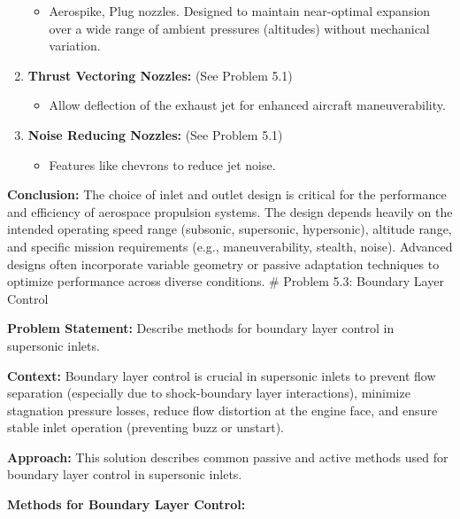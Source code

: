 \begin{enumerate}
  \begin{itemize}
  \tightlist
  \item
    Aerospike, Plug nozzles. Designed to maintain near-optimal expansion
    over a wide range of ambient pressures (altitudes) without
    mechanical variation.
  \end{itemize}
\item
  \textbf{Thrust Vectoring Nozzles:} (See Problem 5.1)

  \begin{itemize}
  \tightlist
  \item
    Allow deflection of the exhaust jet for enhanced aircraft
    maneuverability.
  \end{itemize}
\item
  \textbf{Noise Reducing Nozzles:} (See Problem 5.1)

  \begin{itemize}
  \tightlist
  \item
    Features like chevrons to reduce jet noise.
  \end{itemize}
\end{enumerate}

\textbf{Conclusion:} The choice of inlet and outlet design is critical
for the performance and efficiency of aerospace propulsion systems. The
design depends heavily on the intended operating speed range (subsonic,
supersonic, hypersonic), altitude range, and specific mission
requirements (e.g., maneuverability, stealth, noise). Advanced designs
often incorporate variable geometry or passive adaptation techniques to
optimize performance across diverse conditions. \# Problem 5.3: Boundary
Layer Control

\textbf{Problem Statement:} Describe methods for boundary layer control
in supersonic inlets.

\textbf{Context:} Boundary layer control is crucial in supersonic inlets
to prevent flow separation (especially due to shock-boundary layer
interactions), minimize stagnation pressure losses, reduce flow
distortion at the engine face, and ensure stable inlet operation
(preventing buzz or unstart).

\textbf{Approach:} This solution describes common passive and active
methods used for boundary layer control in supersonic inlets.

\textbf{Methods for Boundary Layer Control:}

